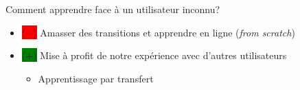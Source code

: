 \documentclass[french]{beamer}
\newcommand{\cplus}{\colorbox{green}{($+$)} }
\newcommand{\cmoins}{\colorbox{red}{($-$)} }
\begin{document}
    \begin{frame}{}


        \begin{alertblock}{}
            Comment apprendre face à un utilisateur inconnu?
        \end{alertblock}


        \begin{itemize}
            \item \cmoins Amasser des transitions et apprendre en ligne (\textit{from scratch})
            \item \cplus Mise à profit de notre expérience avec d'autres utilisateurs
            \begin{itemize}
                \item Apprentissage par transfert
            \end{itemize}

        \end{itemize}


    \end{frame}
\end{document}
